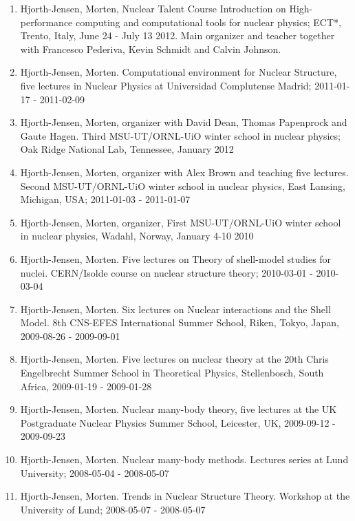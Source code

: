 \documentclass[aps,floatfix,preprint]{revtex4-1}
\begin{document}
\begin{enumerate}
\item Hjorth-Jensen, Morten, Nuclear Talent Course  Introduction on High-performance computing and computational tools for nuclear physics; ECT*, Trento, Italy, June 24 - July 13 2012. Main organizer and teacher together with Francesco Pederiva, Kevin Schmidt and Calvin Johnson. 

\item Hjorth-Jensen, Morten. Computational environment for Nuclear Structure, five lectures in Nuclear Physics at Universidad Complutense Madrid; 2011-01-17 - 2011-02-09

\item Hjorth-Jensen, Morten, organizer with David Dean, Thomas Papenprock and Gaute Hagen. Third MSU-UT/ORNL-UiO winter school in nuclear physics; Oak Ridge National Lab, Tennessee, January 2012

\item Hjorth-Jensen, Morten, organizer with Alex Brown and teaching five lectures. Second MSU-UT/ORNL-UiO winter school in nuclear physics, East Lansing, Michigan, USA; 2011-01-03 - 2011-01-07

\item Hjorth-Jensen, Morten, organizer, First MSU-UT/ORNL-UiO winter school in nuclear physics, Wadahl, Norway, January 4-10 2010

\item Hjorth-Jensen, Morten.  Five lectures on Theory of shell-model studies for nuclei. CERN/Isolde course on nuclear structure theory; 2010-03-01 - 2010-03-04

\item Hjorth-Jensen, Morten.  Six lectures on Nuclear interactions and the Shell Model. 8th CNS-EFES International Summer School, Riken, Tokyo, Japan, 2009-08-26 - 2009-09-01

\item Hjorth-Jensen, Morten.  Five lectures on nuclear theory at the  20th Chris Engelbrecht Summer School in Theoretical Physics, Stellenbosch, South Africa,  2009-01-19 - 2009-01-28

\item Hjorth-Jensen, Morten.  Nuclear many-body theory, five lectures at the  UK Postgraduate Nuclear Physics Summer School, Leicester, UK,  2009-09-12 - 2009-09-23

\item Hjorth-Jensen, Morten.  Nuclear many-body methods. Lectures series at Lund University; 2008-05-04 - 2008-05-07

\item Hjorth-Jensen, Morten.  Trends in Nuclear Structure Theory. Workshop at the University of Lund; 2008-05-07 - 2008-05-07


\end{enumerate}
\end{document}
